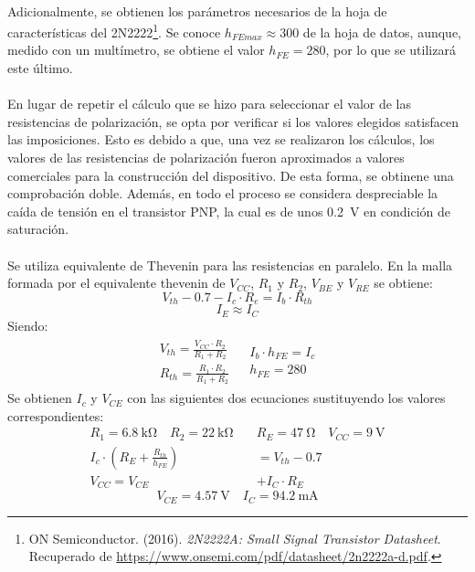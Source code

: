 \paragraph{}
Adicionalmente, se obtienen los par\'ametros necesarios de la hoja de características del 2N2222\footnote{ON Semiconductor. (2016). \textit{2N2222A: Small Signal Transistor Datasheet}. Recuperado de \url{https://www.onsemi.com/pdf/datasheet/2n2222a-d.pdf}.}.
Se conoce $h_{FEmax} \approx 300$ de la hoja de datos, aunque, medido con un mult\'imetro, se obtiene el valor $h_{FE} = 280$, por lo que se utilizar\'a este \'ultimo.
\paragraph{}
En lugar de repetir el cálculo que se hizo para seleccionar el valor de las resistencias de polarización, se opta por verificar si los valores elegidos satisfacen las imposiciones. 
Esto es debido a que, una vez se realizaron los c\'alculos, los valores de las resistencias de polarizaci\'on fueron aproximados a valores comerciales para la construcci\'on del dispositivo. De esta forma, se obtinene una comprobaci\'on doble. Adem\'as, en todo el proceso se considera despreciable la ca\'ida de tensi\'on en el transistor PNP, la cual es de unos \SI{.2}{\volt} en condici\'on de saturaci\'on.
\paragraph{}
Se utiliza equivalente de Thevenin para las resistencias en paralelo. En la malla formada por el equivalente thevenin de $V_{CC}$, $R_1$ y $R_2$, $V_{BE}$ y $V_{RE}$ se obtiene:
$$V_{th} - 0.7 - I_c \cdot R_e = I_b \cdot R_{th}$$
$$ I_E \approx I_C $$
Siendo:
\renewcommand{\arraystretch}{1.5}
\[
\begin{array}{rl} 
      \begin{array}{l}
	 V_{th} = \frac{V_{CC} \cdot R_2}{R_1+R_2} \\
	 R_{th} = \frac{R_1 \cdot R_2}{R_1+R_2}
      \end{array}
      &
      \begin{array}{l}
	 I_b \cdot h_{FE}= I_c \\
	 h_{FE} = 280
      \end{array}
\end{array}
\]
Se obtienen $I_c$ y $V_{CE}$ con las siguientes dos ecuaciones sustituyendo los valores correspondientes:
\begin{align*}
   R_1=\SI{6.8}{\kilo\ohm} \quad R_2=\SI{22}{\kilo\ohm} \quad &R_E=\SI{47}{\ohm} \quad V_{CC} = \SI{9}{\volt} \\
   I_c \cdot \left( R_E+ \frac{R_{th}}{h_{FE}}\right) &= V_{th} - 0.7 \\
   V_{CC} = V_{CE} &+ I_C \cdot R_E
\end{align*}
\begin{equation}
   V_{CE}= \SI{4.57}{\volt} \quad I_C = \SI{94.2}{\milli\ampere}
\end{equation}
